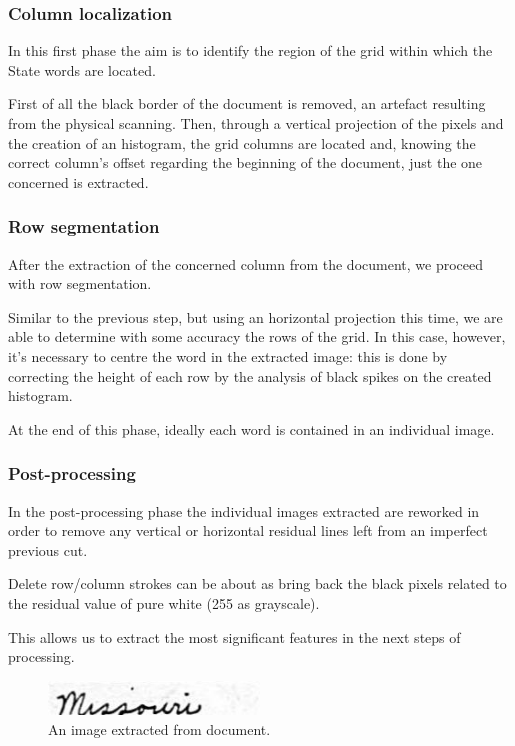 \subsubsection{Column localization}

In this first phase the aim is to identify the region of the grid within which the State words are located. 

First of all the black border of the document is removed, an artefact resulting from the physical scanning. Then, through a vertical projection of the pixels and the creation of an histogram, the grid columns are located and, knowing the correct column's offset regarding the beginning of the document, just the one concerned is extracted.

\subsubsection{Row segmentation}

After the extraction of the concerned column from the document, we proceed with row segmentation.

Similar to the previous step, but using an horizontal projection this time, we are able to determine with some accuracy the rows of the grid. In this case, however, it's necessary to centre the word in the extracted image: this is done by correcting the height of each row by the analysis of black spikes on the created histogram.

At the end of this phase, ideally each word is contained in an individual image.

\subsubsection{Post-processing}

In the post-processing phase the individual images extracted are reworked in order to remove any  vertical or horizontal residual lines left from an imperfect previous cut.

Delete row/column strokes can be about as bring back the black pixels related to the residual value of pure white (255 as grayscale).

This allows us to extract the most significant features in the next steps of processing.

\begin{figure}[!ht]
\centering
\vspace{0.3cm}
\includegraphics[width=0.5\textwidth]{images/missouri.jpg}
\caption{An image extracted from document.}
\label{fig:extracted_image}
\end{figure}

